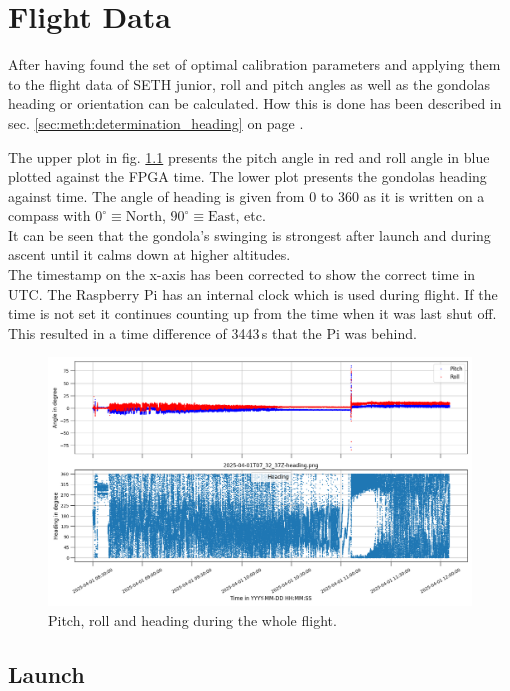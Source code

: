 \chapter{Flight Data \label{ch:flight_data}}
After having found the set of optimal calibration parameters and applying them to the flight data of \ac{SETH} junior, roll and pitch angles as well as the gondolas heading or orientation can be calculated. How this is done has been described in sec. \ref{sec:meth:determination_heading} on page \pageref{sec:meth:determination_heading}.

The upper plot in fig. \ref{fig:res:flight_heading} presents the pitch angle in red and roll angle in blue plotted against the \ac{FPGA} time. The lower plot presents the gondolas heading against time. The angle of heading is given from 0 to 360 as it is written on a compass with $0^\circ\equiv\mathrm{North}$, $90^\circ\equiv\mathrm{East}$, etc.\\
It can be seen that the gondola's swinging is strongest after launch and during ascent until it calms down at higher altitudes.\\
The timestamp on the x-axis has been corrected to show the correct time in UTC. The Raspberry Pi has an internal clock which is used during flight. If the time is not set it continues counting up from the time when it was last shut off. This resulted in a time difference of 3443\,s that the Pi was behind.

\begin{figure}[H]
    \centering
    \includegraphics[width=\linewidth]{images/04_results/flight_heading.png}
    \caption{Pitch, roll and heading during the whole flight.}
    \label{fig:res:flight_heading}
\end{figure}

\section{Launch \label{sec:launch}}

